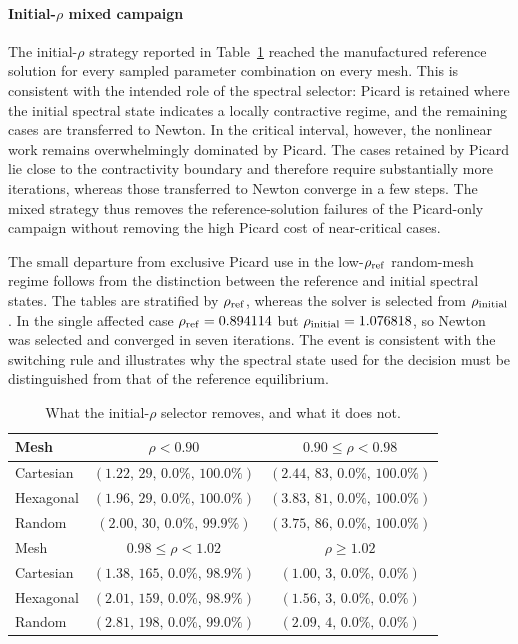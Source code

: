 \paragraph{Initial-$\rho$ mixed campaign}
The initial-$\rho$ strategy reported in Table~\ref{tab:final_mixed_initial} reached the manufactured reference solution for every sampled parameter combination on every mesh. This is consistent with the intended role of the spectral selector: Picard is retained where the initial spectral state indicates a locally contractive regime, and the remaining cases are transferred to Newton. In the critical interval, however, the nonlinear work remains overwhelmingly dominated by Picard. The cases retained by Picard lie close to the contractivity boundary and therefore require substantially more iterations, whereas those transferred to Newton converge in a few steps. The mixed strategy thus removes the reference-solution failures of the Picard-only campaign without removing the high Picard cost of near-critical cases.

The small departure from exclusive Picard use in the low-$\rho_{\rm ref}$ random-mesh regime follows from the distinction between the reference and initial spectral states. The tables are stratified by $\rho_{\rm ref}$, whereas the solver is selected from $\rho_{\rm initial}$. In the single affected case $\rho_{\rm ref}=0.894114$ but $\rho_{\rm initial}=1.076818$, so Newton was selected and converged in seven iterations. The event is consistent with the switching rule and illustrates why the spectral state used for the decision must be distinguished from that of the reference equilibrium.

\begin{table}[htb]
\centering
\caption{What the initial-$\rho$ selector removes, and what it does not.}
\label{tab:final_mixed_initial}
\setlength{\tabcolsep}{7pt}
\begin{tabular}{lcc}
\toprule
\rowcolor{gray!12}
Mesh &
$\rho<0.90$ &
$0.90\leq\rho<0.98$ \\
\midrule
Cartesian &
$(1.22,\,29,\,0.0\%, \,100.0\%)$ &
$(2.44,\,83,\,0.0\%, \,100.0\%)$ \\
Hexagonal &
$(1.96,\,29,\,0.0\%, \,100.0\%)$ &
$(3.83,\,81,\,0.0\%, \,100.0\%)$ \\
Random &
$(2.00,\,30,\,0.0\%, \,99.9\%)$ &
$(3.75,\,86,\,0.0\%, \,100.0\%)$ \\

\addlinespace[2pt]
\rowcolor{gray!12}
Mesh &
$0.98\leq\rho<1.02$ &
$\rho\geq1.02$ \\
\midrule
Cartesian &
$(1.38,\,165,\,0.0\%, \,98.9\%)$ &
$(1.00,\,3,\,0.0\%, \,0.0\%)$ \\
Hexagonal &
$(2.01,\,159,\,0.0\%, \,98.9\%)$ &
$(1.56,\,3,\,0.0\%, \,0.0\%)$ \\
Random &
$(2.81,\,198,\,0.0\%, \,99.0\%)$ &
$(2.09,\,4,\,0.0\%, \,0.0\%)$ \\
\bottomrule
\end{tabular}
\end{table}



